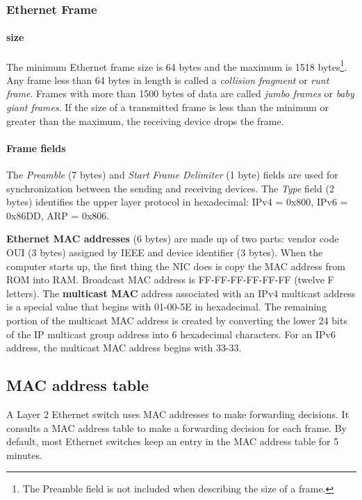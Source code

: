 \subsubsection{Ethernet Frame}

\paragraph{size} The minimum Ethernet frame size is 64 bytes and the maximum is 1518 bytes\footnote{ The Preamble field is not included when describing the size of a frame.}. Any frame less than 64 bytes in length is called a \emph{collision fragment} or \emph{runt frame}. Frames with more than 1500 bytes of data are called \emph{jumbo frames} or \emph{baby giant frames}. If the size of a transmitted frame is less than the minimum or greater than the maximum, the receiving device drops the frame. 

\paragraph{Frame fields} The \emph{Preamble} (7 bytes) and \emph{Start Frame Delimiter} (1 byte) fields are used for synchronization between the sending and receiving devices. The \emph{Type} field (2 bytes) identifies the upper layer protocol in hexadecimal: IPv4 = 0x800, IPv6 = 0x86DD, ARP = 0x806.

\textbf{Ethernet MAC addresses} (6 bytes) are made up of two parts: vendor code OUI (3 bytes) assigned by IEEE and device identifier (3 bytes). When the computer starts up, the first thing the NIC does is copy the MAC address from ROM into RAM. Broadcast MAC address is FF-FF-FF-FF-FF-FF (twelve F letters). The \textbf{multicast MAC} address associated with an IPv4 multicast address is a special value that begins with 01-00-5E in hexadecimal. The remaining portion of the multicast MAC address is created by converting the lower 24 bits of the IP multicast group address into 6 hexadecimal characters. For an IPv6 address, the multicast MAC address begins with 33-33.

\subsection{MAC address table}

A Layer 2 Ethernet switch uses MAC addresses to make forwarding decisions. It consults a MAC address table to make a forwarding decision for each frame. By default, most Ethernet switches keep an entry in the MAC address table for 5 minutes.\\

